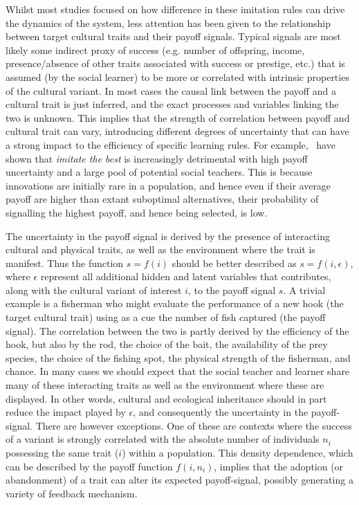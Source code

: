 \documentclass[review,authoryear]{elsarticle}
\begin{document}
Whilst most studies focused on how difference in these imitation rules can drive the dynamics of the system, less attention has been given to the relationship between target cultural traits and their payoff signals. Typical signals are most likely some indirect proxy of success (e.g. number of offspring, income, presence/absence of other traits associated with success or prestige, etc.)  that is assumed (by the social learner) to be more or correlated with intrinsic properties of the cultural variant. In most cases the causal link between the payoff and a cultural trait is just inferred, and the exact processes and variables linking the two is unknown. This implies that the strength of correlation between payoff and cultural trait can vary, introducing different degrees of uncertainty that can have a strong impact to the efficiency of specific learning rules. For example,~\citet{crema_lake_inpress} have shown that \emph{imitate the best} is increasingly detrimental with high payoff uncertainty and a large pool of potential social teachers. This is because innovations are initially rare in a population, and hence even if their average payoff are higher than extant suboptimal alternatives, their probability of signalling the highest payoff, and hence being selected, is low.

The uncertainty in the payoff signal is derived by the presence of interacting cultural and physical traits, as well as the environment where the trait is manifest. Thus the function $s=f(i)$ should be better described as $s=f(i,\epsilon)$, where $\epsilon$ represent all additional hidden and latent variables that contributes, along with the cultural variant of interest $i$, to the payoff signal $s$. A trivial example is a fisherman who might evaluate the performance of a new hook (the target cultural trait) using as a cue the number of fish captured (the payoff signal). The correlation between the two is partly derived by the efficiency of the hook, but also by the rod, the choice of the bait, the availability of the prey species, the choice of the fishing spot, the physical strength of the fisherman, and chance. In many cases we should expect that the social teacher and learner share many of these interacting traits as well as the environment where these are displayed. In other words, cultural and ecological inheritance should in part reduce the impact played by $\epsilon$, and consequently the uncertainty in the payoff-signal. There are however exceptions. One of these are contexts where the success of a variant is strongly correlated with the absolute number of individuals $n_i$ possessing the same trait ($i$) within a population. This density dependence, which can be described by the payoff function $f(i,n_i)$, implies that the adoption (or abandonment) of a trait can alter its expected payoff-signal, possibly generating a variety of feedback mechanism.  
\end{document}
